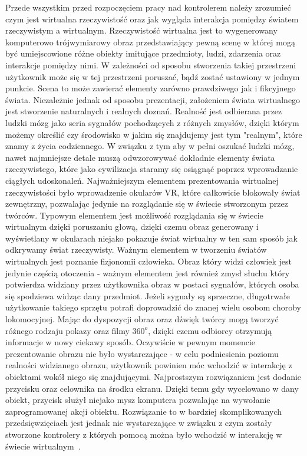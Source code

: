 	Przede wszystkim przed rozpoczęciem pracy nad kontrolerem należy zrozumieć czym jest wirtualna rzeczywistość oraz jak wygląda interakcja pomiędzy światem rzeczywistym a wirtualnym. Rzeczywistość wirtualna jest to wygenerowany komputerowo trójwymiarowy obraz przedstawiający pewną scenę w której mogą być umiejscowione różne obiekty imitujące przedmioty, ludzi, zdarzenia oraz interakcje pomiędzy nimi. W zależności od sposobu stworzenia takiej przestrzeni użytkownik może się w tej przestrzeni poruszać, bądź zostać ustawiony w jednym punkcie. Scena to może zawierać elementy zarówno prawdziwego jak i fikcyjnego świata. Niezależnie jednak od sposobu prezentacji, założeniem świata wirtualnego jest stworzenie naturalnych i realnych doznań. Realność jest odbierana przez ludzki mózg jako seria sygnałów pochodzących z różnych zmysłów, dzięki którym możemy określić czy środowisko w jakim się znajdujemy jest tym "realnym", które znamy z życia codziennego. W związku z tym aby w pełni oszukać ludzki mózg, nawet najmniejsze detale muszą odwzorowywać dokładnie elementy świata rzeczywistego, które jako cywilizacja staramy się osiągnąć poprzez wprowadzanie ciągłych udoskonaleń. Najważniejszym elementem prezentowania wirtualnej rzeczywistości było wprowadzenie okularów VR, które całkowicie blokowały świat zewnętrzny, pozwalając jedynie na rozglądanie się w świecie stworzonym przez twórców. Typowym elementem jest możliwość rozglądania się w świecie wirtualnym dzięki poruszaniu głową, dzięki czemu obraz generowany i wyświetlany w okularach niejako pokazuje świat wirtualny w ten sam sposób jak odkrywamy świat rzeczywisty. Ważnym elementem w tworzeniu światów wirtualnych jest poznanie fizjonomii człowieka. Obraz który widzi człowiek jest jedynie częścią otoczenia - ważnym elementem jest również zmysł słuchu który potwierdza widziany przez użytkownika obraz w postaci sygnałów, których osoba się spodziewa widząc dany przedmiot. Jeżeli sygnały są sprzeczne, długotrwałe użytkowanie takiego sprzętu potrafi doprowadzić do znanej wielu osobom choroby lokomocyjnej. Mając do dyspozycji obraz oraz dźwięk twórcy mogą tworzyć różnego rodzaju pokazy oraz filmy $360^o$, dzięki czemu odbiorcy otrzymują informacje w nowy ciekawy sposób. Oczywiście w pewnym momencie prezentowanie obrazu nie było wystarczające - w celu podniesienia poziomu realności widzianego obrazu, użytkownik powinien móc wchodzić w interakcję z obiektami wokół niego się znajdującymi. Najprostszym rozwiązaniem jest dodanie przycisku oraz celownika na środku ekranu. Dzięki temu gdy wycelowano w dany obiekt, przycisk służył niejako mysz komputera pozwalając na wywołanie zaprogramowanej akcji obiektu. Rozwiązanie to w bardziej skomplikowanych przedsięwzięciach jest jednak nie wystarczające w związku z czym zostały stworzone kontrolery z których pomocą można było wchodzić w interakcję w świecie wirtualnym~\cite{vrHistory}. 

